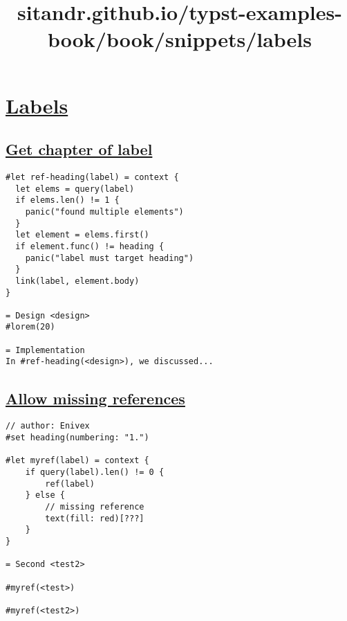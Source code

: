\title{sitandr.github.io/typst-examples-book/book/snippets/labels}

\section{\texorpdfstring{\hyperref[labels]{Labels}}{Labels}}\label{labels}

\subsection{\texorpdfstring{\hyperref[get-chapter-of-label]{Get chapter
of label}}{Get chapter of label}}\label{get-chapter-of-label}

\begin{verbatim}
#let ref-heading(label) = context {
  let elems = query(label)
  if elems.len() != 1 {
    panic("found multiple elements")
  }
  let element = elems.first()
  if element.func() != heading {
    panic("label must target heading")
  }
  link(label, element.body)
}

= Design <design>
#lorem(20)

= Implementation
In #ref-heading(<design>), we discussed...
\end{verbatim}

\pandocbounded{}

\subsection{\texorpdfstring{\hyperref[allow-missing-references]{Allow
missing
references}}{Allow missing references}}\label{allow-missing-references}

\begin{verbatim}
// author: Enivex
#set heading(numbering: "1.")

#let myref(label) = context {
    if query(label).len() != 0 {
        ref(label)
    } else {
        // missing reference
        text(fill: red)[???]
    }
}

= Second <test2>

#myref(<test>)

#myref(<test2>)
\end{verbatim}

\pandocbounded{}
